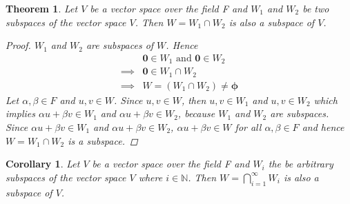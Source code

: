 \documentclass[a4paper, titlepage]{article}
\newtheorem{theorem}{Theorem}[section]
\newtheorem{corollary}{Corollary}[theorem]
\begin{document}
\begin{theorem}
    Let $V$ be a vector space over the field F and $W_1$ and $W_2$ 
    be two subspaces of the vector space $V$. Then $W = W_1 \cap W_2$ 
    is also a subspace of $V$.
    \begin{proof}
        $W_1$ and $W_2$ are subspaces of $W$. Hence
        \begin{align*}
            & \bm{0} \in W_1 \text{ and } \bm{0} \in W_2 \\
            \implies & \bm{0} \in W_1 \cap W_2 \\
            \implies & W = (W_1 \cap W_2) \neq \bm{\phi}
        \end{align*}
        Let $\alpha, \beta \in F$ and $u, v \in W$. Since $u, v \in W$,
        then $u, v \in W_1$ and $u, v \in W_2$ which implies 
        $\alpha u + \beta v \in W_1$ and $\alpha u + \beta v \in W_2$,
        because $W_1$ and $W_2$ are subspaces. 
        Since $\alpha u + \beta v \in W_1$ and $\alpha u + \beta v \in W_2$, 
        $\alpha u + \beta v \in W$ for all $\alpha, \beta \in F$ and 
        hence $W = W_1 \cap W_2$ is a subspace.
    \end{proof}
\end{theorem}
\begin{corollary}
    Let $V$ be a vector space over the field F and $W_i$ the be 
    arbitrary subspaces of the vector space $V$ where $i \in \mathbb{N}$. 
    Then $W = \displaystyle\bigcap_{i = 1}^{\infty} W_i$ is also a 
    subspace of $V$.
\end{corollary}
\end{document}
